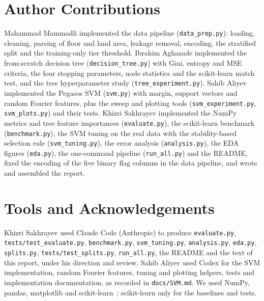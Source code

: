 \documentclass[10pt,twocolumn,a4paper]{article}
\begin{document}
\section*{Author Contributions}
{\raggedright
Mahammad Mammadli implemented the data pipeline (\texttt{data\_prep.py}):
loading, cleaning, parsing of floor and land area, leakage removal,
encoding, the stratified split and the training-only tier threshold.
Ibrahim Aghazade implemented the from-scratch decision tree
(\texttt{decision\_tree.py}) with Gini, entropy and MSE criteria, the four
stopping parameters, node statistics and the scikit-learn match test, and
the tree hyperparameter study (\texttt{tree\_experiment.py}). Sahib Aliyev implemented the Pegasos SVM
(\texttt{svm.py}) with margin, support vectors and random Fourier
features, plus the sweep and plotting tools (\texttt{svm\_experiment.py},
\texttt{svm\_plots.py}) and their tests. Khizri Sakhrayev implemented the
NumPy metrics and tree feature importances (\texttt{evaluate.py}), the
scikit-learn benchmark (\texttt{benchmark.py}), the SVM tuning on the real
data with the stability-based selection rule (\texttt{svm\_tuning.py}),
the error analysis (\texttt{analysis.py}), the EDA figures
(\texttt{eda.py}), the one-command pipeline (\texttt{run\_all.py}) and the
README, fixed the encoding of the five binary flag columns in the data
pipeline, and wrote and assembled the report.\par}

\section*{Tools and Acknowledgements}
{\raggedright
Khizri Sakhrayev used Claude Code (Anthropic) to produce
\texttt{evaluate.py}, \texttt{tests/test\_evaluate.py},
\texttt{benchmark.py}, \texttt{svm\_tuning.py}, \texttt{analysis.py},
\texttt{eda.py}, \texttt{splits.py}, \texttt{tests/test\_splits.py},
\texttt{run\_all.py}, the README
and the text of this report, under his direction and review. Sahib Aliyev
used Codex for the SVM implementation, random Fourier features, tuning and
plotting helpers, tests and implementation documentation, as recorded in
\texttt{docs/SVM.md}. We used NumPy, pandas, matplotlib and
scikit-learn~\cite{sklearn}; scikit-learn only for the baselines and
tests.\par}
\end{document}
